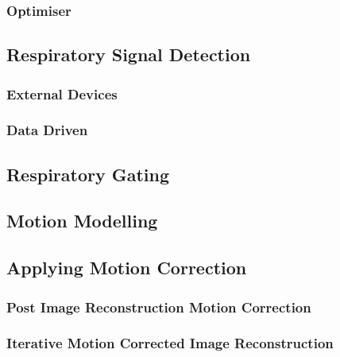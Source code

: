             \subsubsection{Optimiser} \label{image_registration_optimiser}
                \blindtext
            
        \subsection{Respiratory Signal Detection} \label{respiratory_signal_detection}
            \blindtext
            
            \subsubsection{External Devices} \label{external_devices}
                \blindtext
                
            \subsubsection{Data Driven} \label{data_driven}
                \blindtext
                
        \subsection{Respiratory Gating} \label{respiratory_gating}
            \blindtext
            
        \subsection{Motion Modelling} \label{motion_modelling}
            \blindtext
        
        \subsection{Applying Motion Correction} \label{applying_motion_correction}
            \blindtext
            
            \subsubsection{Post Image Reconstruction Motion Correction} \label{post_image_reconstruction_motion_correction}
                \blindtext
                
            \subsubsection{Iterative Motion Corrected Image Reconstruction} \label{iterative_motion_corrected_image_reconstruction}
                \blindtext
    
